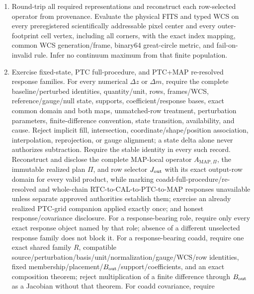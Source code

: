 \documentclass[10pt]{article}
\begin{document}
\begin{enumerate}
construction, verify that every constructed map honors it.  Otherwise verify
that already existing compatible bundles, including persisted coadd-only
inputs, may select a common coadd target and use exact centered-integer
embedding without modifying or relabeling their scientific samples.  An
explicit crop creates a new row-selected product with its own identity and
provenance.
\item Round-trip all required representations and reconstruct each
row-selected operator from provenance. Evaluate the physical FITS and typed
WCS on every preregistered scientifically addressable pixel center and every
outer-footprint cell vertex, including all corners, with the exact index
mapping, common WCS generation/frame, binary64 great-circle metric, and
fail-on-invalid rule. Infer no continuum maximum from that finite population.
\item Exercise fixed-state, PTC full-procedure, and PTC+MAP re-resolved
response families. For every numerical \(\Delta z\) or \(\Delta m\), require
the complete baseline/perturbed identities, quantity/unit, rows, frames/WCS,
reference/gauge/null state, supports, coefficient/response bases, exact common
domain and both maps, unmatched-row treatment, perturbation parameters,
finite-difference convention, state transition, availability, and cause.
Reject implicit fill, intersection, coordinate/shape/position association,
interpolation, reprojection, or gauge alignment; a state delta alone never
authorizes subtraction. Require the stable
\SCIMapComparisonSpaceRecordId{} identity in every such record. Reconstruct and disclose the complete MAP-local operator
\(A_{{\mathrm{MAP}},\Pi}\), the immutable realized plan \(\Pi\), and row
selector \(J_{\rm out}\) with its exact output-row domain for every valid
product, while
marking coadd-full-procedure/re-resolved and whole-chain
RTC-to-CAL-to-PTC-to-MAP responses unavailable unless separate approved
authorities establish them; exercise an already realized
PTC-grid companion applied exactly once; and honest response/covariance
disclosure. For a response-bearing role, require only every exact response
object named by that role; absence of a different unselected response family
does not block it. For a response-bearing coadd, require one exact shared family
\(R\), compatible source/perturbation/basis/unit/normalization/gauge/WCS/row
identities, fixed membership/placement/\(B_{\rm out}\)/support/coefficients, and
an exact composition theorem; reject multiplication of a finite difference
through \(B_{\rm out}\) as a Jacobian without that theorem. For coadd covariance, require

\end{enumerate}
\end{document}
